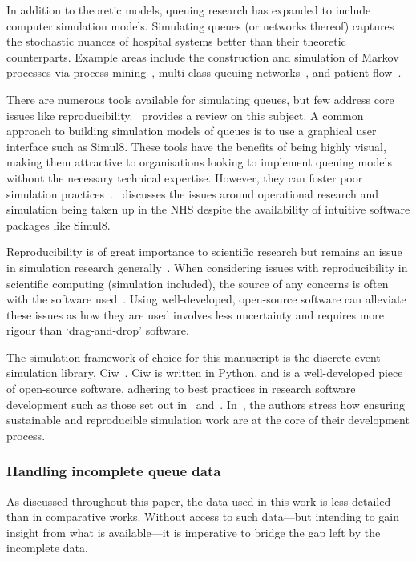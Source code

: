 \documentclass[]{interact}
\theoremstyle{plain}%
\theoremstyle{definition}
\theoremstyle{remark}
\begin{document}
In addition to theoretic models, queuing research has expanded
to include computer simulation models. Simulating queues (or networks thereof)
captures the stochastic nuances of hospital systems better than their theoretic
counterparts. Example areas include the construction and simulation of Markov
processes via process mining~\citep{Arnolds2018,Rebuge2012}, multi-class queuing
networks~\citep{Cochran2009}, and patient flow~\citep{Bhattacharjee2014}.

There are numerous tools available for simulating queues, but few address core
issues like reproducibility.~\cite{Dagkakis2016} provides a review on this
subject. A common approach to building simulation models of queues is to use a
graphical user interface such as Simul8. These tools have the benefits of being
highly visual, making them attractive to organisations looking to implement
queuing models without the necessary technical expertise. However, they can
foster poor simulation practices~\cite{Bell1987}.~\cite{Brailsford2013}
discusses the issues around operational research and simulation being taken up
in the NHS despite the availability of intuitive software packages like Simul8.

Reproducibility is of great importance to scientific research but remains an
issue in simulation research generally~\citep{Fitzpatrick2019}. When considering
issues with reproducibility in scientific computing (simulation included), the
source of any concerns is often with the software used~\citep{Ivie2018}. Using
well-developed, open-source software can alleviate these issues as how they
are used involves less uncertainty and requires more rigour than `drag-and-drop'
software.

The simulation framework of choice for this manuscript is the discrete event
simulation library, Ciw~\citep{Palmer2019}. Ciw is written in Python, and is a
well-developed piece of open-source software, adhering to best practices in
research software development such as those set out in~\cite{Benureau2018}
and~\cite{Jimenez2017}. In~\cite{Palmer2019}, the authors stress how ensuring
sustainable and reproducible simulation work are at the core of their
development process.

\subsubsection{Handling incomplete queue data}

As discussed throughout this paper, the data used in this work is less detailed
than in comparative works. Without access to such data---but intending to gain
insight from what is available---it is imperative to bridge the gap left by the
incomplete data.
\end{document}
